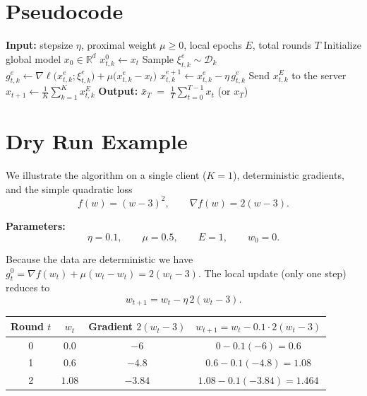 \documentclass[11pt]{article}
\newcommand{\R}{\mathbb{R}}
\begin{document}
\section*{Pseudocode}
\begin{algorithm}[H]
\caption{FedProx with Local SGD}
\label{alg:fedprox}
\begin{algorithmic}[1]
\STATE \textbf{Input:} stepsize $\eta$, proximal weight $\mu\ge0$, local epochs $E$, total rounds $T$
\STATE Initialize global model $x_0\in\R^{d}$
        \STATE $x_{t,k}^{0}\gets x_t$
            \STATE Sample $\xi_{t,k}^{e}\sim\mathcal{D}_k$
            \STATE $g_{t,k}^{e}\gets\nabla\ell\!\bigl(x_{t,k}^{e};\xi_{t,k}^{e}\bigr)+\mu\bigl(x_{t,k}^{e}-x_t\bigr)$
            \STATE $x_{t,k}^{e+1}\gets x_{t,k}^{e}-\eta\,g_{t,k}^{e}$   \hfill{}
        \ENDFOR
        \STATE Send $x_{t,k}^{E}$ to the server
    \ENDFOR
    \STATE $x_{t+1}\gets\frac1K\sum_{k=1}^{K}x_{t,k}^{E}$   \hfill{}
\ENDFOR
\STATE \textbf{Output:} $\displaystyle \bar{x}_T\;=\;\frac1T\sum_{t=0}^{T-1}x_t$ (or $x_T$)
\end{algorithmic}
\end{algorithm}

\section*{Dry Run Example}
We illustrate the algorithm on a single client ($K=1$), deterministic gradients,
and the simple quadratic loss
\[
f(w)= (w-3)^2,\qquad \nabla f(w)=2(w-3).
\]

\textbf{Parameters:}
\[
\eta=0.1,\qquad \mu=0.5,\qquad E=1,\qquad w_0=0.
\]

Because the data are deterministic we have $g_t^{0}= \nabla f(w_t)+\mu(w_t-w_t)=2(w_t-3)$.
The local update (only one step) reduces to
\[
w_{t+1}= w_t-\eta\,2(w_t-3).
\]

\begin{center}
\begin{tabular}{c|c|c|c}
\toprule
Round $t$ & $w_t$ & Gradient $2(w_t-3)$ & $w_{t+1}=w_t-0.1\cdot2(w_t-3)$ \\
\midrule
0 & $0.0$ & $-6$ & $0-0.1(-6)=0.6$ \\
1 & $0.6$ & $-4.8$ & $0.6-0.1(-4.8)=1.08$ \\
2 & $1.08$ & $-3.84$ & $1.08-0.1(-3.84)=1.464$ \\
\bottomrule
\end{tabular}
\end{center}
\end{document}
